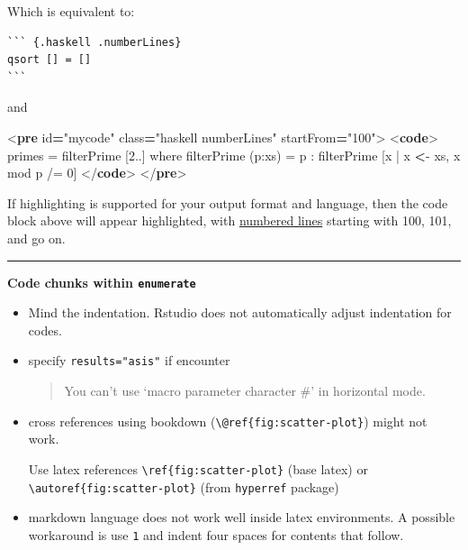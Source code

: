 \documentclass[
  a4paper,
  twoside,
  openright]{book}
\newenvironment{Shaded}{\begin{snugshade}}{\end{snugshade}}
\newcommand{\DataTypeTok}[1]{\textcolor[rgb]{0.13,0.29,0.53}{#1}}
\newcommand{\ErrorTok}[1]{\textcolor[rgb]{0.64,0.00,0.00}{\textbf{#1}}}
\newcommand{\KeywordTok}[1]{\textcolor[rgb]{0.13,0.29,0.53}{\textbf{#1}}}
\newcommand{\NormalTok}[1]{#1}
\newcommand{\OperatorTok}[1]{\textcolor[rgb]{0.81,0.36,0.00}{\textbf{#1}}}
\newcommand{\OtherTok}[1]{\textcolor[rgb]{0.56,0.35,0.01}{#1}}
\newcommand{\StringTok}[1]{\textcolor[rgb]{0.31,0.60,0.02}{#1}}
\theoremstyle{definition}
\theoremstyle{definition}
\theoremstyle{definition}
\theoremstyle{definition}
\theoremstyle{remark}
\begin{document}
Which is equivalent to:

\begin{verbatim}
``` {.haskell .numberLines}
qsort [] = []
```
\end{verbatim}

and

\begin{Shaded}
\begin{Highlighting}[]
\DataTypeTok{\textless{}}\KeywordTok{pre}\OtherTok{ id}\OperatorTok{=}\StringTok{"mycode"}\OtherTok{ class}\OperatorTok{=}\StringTok{"haskell numberLines"}\OtherTok{ startFrom}\OperatorTok{=}\StringTok{"100"}\DataTypeTok{\textgreater{}}
  \DataTypeTok{\textless{}}\KeywordTok{code}\DataTypeTok{\textgreater{}}
\NormalTok{  primes = filterPrime [2..] where}
\NormalTok{  filterPrime (p:xs) =}
\NormalTok{    p : filterPrime [x | x }\ErrorTok{\textless{}}\NormalTok{{-} xs, x \textasciigrave{}mod\textasciigrave{} p /= 0]}
  \DataTypeTok{\textless{}/}\KeywordTok{code}\DataTypeTok{\textgreater{}}
\DataTypeTok{\textless{}/}\KeywordTok{pre}\DataTypeTok{\textgreater{}}  
\end{Highlighting}
\end{Shaded}

If highlighting is supported for your output format and language, then the code block above will appear highlighted, with \href{https://bookdown.org/yihui/rmarkdown-cookbook/number-lines.html}{numbered lines} starting with 100, 101, and go on.

\begin{center}\rule{0.5\linewidth}{0.5pt}\end{center}

\textbf{Code chunks within \texttt{enumerate}}

\begin{itemize}
\item
  Mind the indentation. Rstudio does not automatically adjust indentation for codes.
\item
  specify \texttt{results="asis"} if encounter

  \begin{quote}
  You can't use `macro parameter character \#' in horizontal mode.
  \end{quote}
\item
  cross references using bookdown (\texttt{\textbackslash{}@ref\{fig:scatter-plot\}}) might not work.

  Use latex references \texttt{\textbackslash{}ref\{fig:scatter-plot\}} (base latex) or \texttt{\textbackslash{}autoref\{fig:scatter-plot\}} (from \texttt{hyperref} package)
\item
  markdown language does not work well inside latex environments. A possible workaround is use \texttt{1} and indent four spaces for contents that follow.
\end{itemize}
\end{document}
